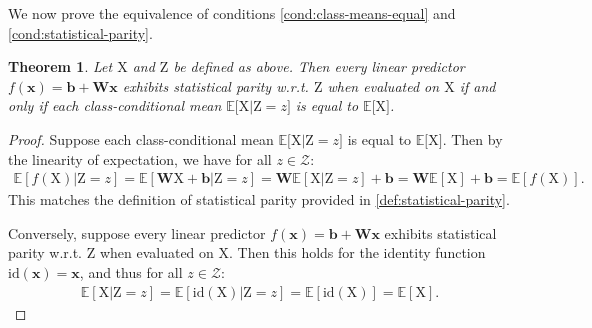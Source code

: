 \documentclass{article}
\theoremstyle{plain}
\newtheorem{theorem}{Theorem}[section]
\theoremstyle{remark}
\newcommand{\E}{\mathbb E}
\theoremstyle{plain}
\theoremstyle{TheoremNum}
\newcommand{\rv}[1]{{\mathrm{#1}}}
\begin{document}
We now prove the equivalence of conditions \ref{cond:class-means-equal} and \ref{cond:statistical-parity}.

\begin{theorem}\label{thm:main-task}
    Let $\rv X$ and $\rv Z$ be defined as above. Then every linear predictor $f(\mathbf{x}) = \mathbf{b} + \mathbf{Wx}$ exhibits statistical parity w.r.t. $\rv Z$ when evaluated on $\rv X$ if and only if each class-conditional mean $\E\big[\rv X|\rv Z = z\big]$ is equal to $\E\big[\rv X\big]$.
\end{theorem}
\begin{proof}
    Suppose each class-conditional mean $\E\big[\rv X|\rv Z = z\big]$ is equal to $\E\big[\rv X\big]$. Then by the linearity of expectation, we have for all $z \in \mathcal{Z}$:
    \begin{align*}
        \E[f(\rv X)| \rv Z = z] = \E[\mathbf{W}\rv X + \mathbf{b}| \rv Z = z] = \mathbf{W}\E[\rv X| \rv Z = z] + \mathbf{b} = \mathbf{W}\E[\rv X] + \mathbf{b} = \E[f(\rv X)].
    \end{align*}
    This matches the definition of statistical parity provided in \cref{def:statistical-parity}.

    Conversely, suppose every linear predictor $f(\mathbf{x}) = \mathbf{b} + \mathbf{Wx}$ exhibits statistical parity w.r.t. $\rv Z$ when evaluated on $\rv X$. Then this holds for the identity function $\mathrm{id}(\mathbf{x}) = \mathbf{x}$, and thus for all $z \in \mathcal{Z}$:
    \begin{align*}
        \E[\rv X | \rv Z = z] = \E[\mathrm{id}(\rv X) | \rv Z = z] = \E[\mathrm{id}(\rv X)] = \E[\rv X].
    \end{align*}
\end{proof}
\end{document}

